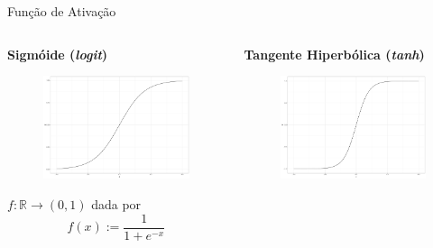 \documentclass[xcolor=table]{beamer}
\newcommand{\R}{\mathds{R}}
\begin{document}
    \begin{frame}{Função de Ativação}
        \begin{columns}[onlytextwidth,t]
            \begin{column}{0.48\textwidth}
                \centering
                \textbf{Sigmóide (\textit{logit})}
                
                \begin{figure}
                    \includegraphics[scale=0.12]{figuras/sigmoid.pdf}
	            \end{figure}
	               
	            $f: \R \rightarrow (0,1)$ dada por 
	            \[f(x) := \frac{1}{1 + e^{-x}}\]
	            
            \end{column}

            \begin{column}{0.48\textwidth}
                \centering
                \textbf{Tangente Hiperbólica (\textit{tanh})}
            
                \begin{figure}
                     \includegraphics[scale=0.12]{figuras/tanh.pdf}
	            \end{figure}
	            

\end{column}
\end{columns}
\end{frame}
\end{document}
